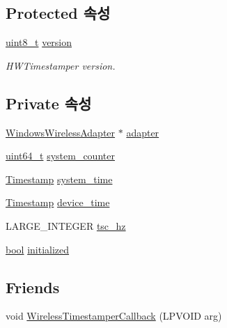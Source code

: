 \subsection*{Protected 속성}
\begin{DoxyCompactItemize}
\item 
\hyperlink{stdint_8h_aba7bc1797add20fe3efdf37ced1182c5}{uint8\+\_\+t} \hyperlink{class_common_timestamper_ab22abc2906422da61885ac6c8e6a1a59}{version}
\begin{DoxyCompactList}\small\item\em H\+W\+Timestamper version. \end{DoxyCompactList}\end{DoxyCompactItemize}
\subsection*{Private 속성}
\begin{DoxyCompactItemize}
\item 
\hyperlink{class_windows_wireless_adapter}{Windows\+Wireless\+Adapter} $\ast$ \hyperlink{class_windows_wireless_timestamper_a1e58e9da895678b96e396f5b17b48e2a}{adapter}
\item 
\hyperlink{parse_8c_aec6fcb673ff035718c238c8c9d544c47}{uint64\+\_\+t} \hyperlink{class_windows_wireless_timestamper_a6cb20ab38891e33e6db7431f500b1ff1}{system\+\_\+counter}
\item 
\hyperlink{class_timestamp}{Timestamp} \hyperlink{class_windows_wireless_timestamper_a12dbc1e510ed1eb316f94c04fcf7d991}{system\+\_\+time}
\item 
\hyperlink{class_timestamp}{Timestamp} \hyperlink{class_windows_wireless_timestamper_a095474901dd00b446c5c1b7da2e354aa}{device\+\_\+time}
\item 
L\+A\+R\+G\+E\+\_\+\+I\+N\+T\+E\+G\+ER \hyperlink{class_windows_wireless_timestamper_a259066718bc34c6231bbefd0b7093b6e}{tsc\+\_\+hz}
\item 
\hyperlink{avb__gptp_8h_af6a258d8f3ee5206d682d799316314b1}{bool} \hyperlink{class_windows_wireless_timestamper_aedeffc7d23da25d52b9a50045189fe2b}{initialized}
\end{DoxyCompactItemize}
\subsection*{Friends}
\begin{DoxyCompactItemize}
\item 
void \hyperlink{class_windows_wireless_timestamper_af2bed527a2a14e4a742ec5d88f75bb5f}{Wireless\+Timestamper\+Callback} (L\+P\+V\+O\+ID arg)
\end{DoxyCompactItemize}


